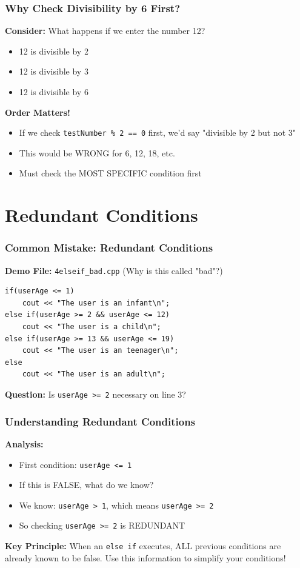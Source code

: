 \documentclass{beamer}
\begin{document}
\begin{frame}
\frametitle{Why Check Divisibility by 6 First?}
\textbf{Consider:} What happens if we enter the number 12?\pause

\begin{itemize}
    \item 12 is divisible by 2 \checkmark
    \item 12 is divisible by 3 \checkmark
    \item 12 is divisible by 6 \checkmark
\end{itemize}\pause

\vspace{0.3cm}
\textbf{Order Matters!}
\begin{itemize}
    \item If we check \texttt{testNumber \% 2 == 0} first, we'd say "divisible by 2 but not 3"
    \item This would be WRONG for 6, 12, 18, etc.
    \item Must check the MOST SPECIFIC condition first
\end{itemize}
\end{frame}

\section{Redundant Conditions}

\begin{frame}[fragile]
\frametitle{Common Mistake: Redundant Conditions}
\textbf{Demo File:} \texttt{4elseif\_bad.cpp} (Why is this called "bad"?)\pause

\begin{verbatim}
if(userAge <= 1)
    cout << "The user is an infant\n";
else if(userAge >= 2 && userAge <= 12)
    cout << "The user is a child\n";
else if(userAge >= 13 && userAge <= 19)
    cout << "The user is an teenager\n";
else
    cout << "The user is an adult\n";
\end{verbatim}

\vspace{0.3cm}\pause
\textbf{Question:} Is \texttt{userAge >= 2} necessary on line 3?
\end{frame}

\begin{frame}
\frametitle{Understanding Redundant Conditions}
\textbf{Analysis:}
\begin{itemize}
    \item First condition: \texttt{userAge <= 1}\pause
    \item If this is FALSE, what do we know?\pause
    \item We know: \texttt{userAge > 1}, which means \texttt{userAge >= 2}\pause
    \item So checking \texttt{userAge >= 2} is REDUNDANT
\end{itemize}\pause

\vspace{0.3cm}
\textbf{Key Principle:} When an \texttt{else if} executes, ALL previous conditions are already known to be false. Use this information to simplify your conditions!
\end{frame}
\end{document}
